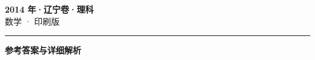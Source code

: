 \documentclass[zihao=5, a4paper]{ctexart}
\begin{document}
\begin{center}
  {\Large\bfseries 2014 年·辽宁卷·理科}\\[4pt]
  {\large 数学 · 印刷版}
\end{center}
\medskip
{}

\par\bigskip\hrule\bigskip
{}
\Needspace{0.55\textheight}
\begin{center}{\large\bfseries 参考答案与详细解析}\end{center}
\smallskip

\end{document}
